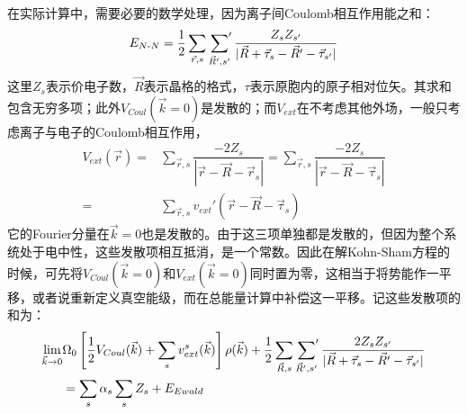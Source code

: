 在实际计算中，需要必要的数学处理，因为离子间Coulomb相互作用能之和：
$$E_{N\textrm{-}N}=\dfrac12\sum_{\vec r,s}\sideset{}{'}\sum_{\vec R',s'}\dfrac{Z_sZ_{s'}}{|\vec R+\vec{\tau}_s-\vec R'-\vec{\tau}_{s'}|}$$
这里$Z_s$表示价电子数，$\vec R$表示晶格的格式，$\tau$表示原胞内的原子相对位矢。其求和包含无穷多项；此外$V_{Coul}(\vec k=0)$是发散的；而$V_{ext}$在不考虑其他外场，一般只考虑离子与电子的Coulomb相互作用，
\begin{equation}
  \begin{split}
    V_{ext}(\vec r)=&\sum_{\vec r,s}\dfrac{-2Z_s}{|\vec r-\vec R-\vec r_s|}=\sum_{\vec r,s}\dfrac{-2Z_s}{|\vec r-\vec R-\vec{\tau}_s|} \\
    =&\sum_{\vec r,s}v_{ext}'(\vec r-\vec R-\vec{\tau}_s)
  \end{split}
  \label{eq:solid-52}
\end{equation}
它的Fourier分量在$\vec k=0$也是发散的。由于这三项单独都是发散的，但因为整个系统处于电中性，这些发散项相互抵消，是一个常数。因此在解Kohn-Sham方程的时候，可先将$V_{Coul}(\vec k=0)$和$V_{ext}(\vec k=0)$同时置为零，这相当于将势能作一平移，或者说重新定义真空能级，而在总能量计算中补偿这一平移。记这些发散项的和为：
\begin{equation}
  \begin{split}
    \lim\limits_{\vec k\rightarrow0}&\Omega_0\left[\dfrac12V_{Coul}(\vec k)+\sum_sv_{ext}^s(\vec k)\right]\rho(\vec k)+\dfrac12\sum_{\vec R,s}\sideset{}{'}\sum_{\vec R',s'}\dfrac{2Z_sZ_{s'}}{|\vec R+\vec{\tau}_s-\vec R'-\vec{\tau}_{s'}|} \\
    &=\sum_s\alpha_s\sum_sZ_s+E_{Ewald}
  \end{split}
  \label{eq:solid-53}
\end{equation}

